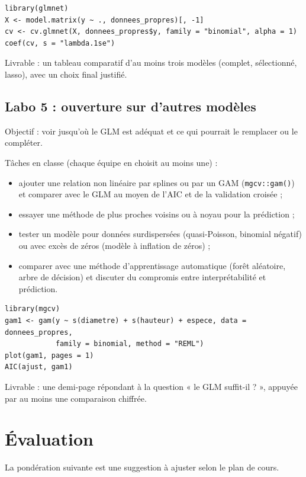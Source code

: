 \documentclass[11pt,letterpaper]{scrartcl}
\begin{document}
\begin{lstlisting}
library(glmnet)
X <- model.matrix(y ~ ., donnees_propres)[, -1]
cv <- cv.glmnet(X, donnees_propres$y, family = "binomial", alpha = 1)
coef(cv, s = "lambda.1se")
\end{lstlisting}

Livrable : un tableau comparatif d'au moins trois modèles (complet, sélectionné, lasso), avec un choix final justifié.

\subsection{Labo 5 : ouverture sur d'autres modèles}

Objectif : voir jusqu'où le GLM est adéquat et ce qui pourrait le remplacer ou le compléter.

Tâches en classe (chaque équipe en choisit au moins une) :
\begin{itemize}
  \item ajouter une relation non linéaire par splines ou par un GAM (\texttt{mgcv::gam()}) et comparer avec le GLM au moyen de l'AIC et de la validation croisée ;
  \item essayer une méthode de plus proches voisins ou à noyau pour la prédiction ;
  \item tester un modèle pour données surdispersées (quasi-Poisson, binomial négatif) ou avec excès de zéros (modèle à inflation de zéros) ;
  \item comparer avec une méthode d'apprentissage automatique (forêt aléatoire, arbre de décision) et discuter du compromis entre interprétabilité et prédiction.
\end{itemize}

\begin{lstlisting}
library(mgcv)
gam1 <- gam(y ~ s(diametre) + s(hauteur) + espece, data = donnees_propres,
            family = binomial, method = "REML")
plot(gam1, pages = 1)
AIC(ajust, gam1)
\end{lstlisting}

Livrable : une demi-page répondant à la question « le GLM suffit-il ? », appuyée par au moins une comparaison chiffrée.

\section{Évaluation}

La pondération suivante est une suggestion à ajuster selon le plan de cours.
\end{document}
